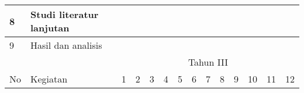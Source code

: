\begin{spacing}{1.5}
\begin{table}[htp]
\begin{tabular}{|l|l|llllllllllll|}
		8                                          & Studi literatur lanjutan                                                             & \multicolumn{1}{l|}{}                         & \multicolumn{1}{l|}{}                         & \multicolumn{1}{l|}{}                         & \multicolumn{1}{l|}{}                         & \multicolumn{1}{l|}{}                         & \multicolumn{1}{l|}{}                         & \multicolumn{1}{l|}{}                         & \multicolumn{1}{l|}{\cellcolor[HTML]{343434}} & \multicolumn{1}{l|}{\cellcolor[HTML]{343434}} & \multicolumn{1}{l|}{\cellcolor[HTML]{343434}} & \multicolumn{1}{l|}{}                         &                          \\ \hline
		9                                          & Hasil dan analisis                                                                   & \multicolumn{1}{l|}{}                         & \multicolumn{1}{l|}{}                         & \multicolumn{1}{l|}{}                         & \multicolumn{1}{l|}{}                         & \multicolumn{1}{l|}{}                         & \multicolumn{1}{l|}{}                         & \multicolumn{1}{l|}{}                         & \multicolumn{1}{l|}{}                         & \multicolumn{1}{l|}{}                         & \multicolumn{1}{l|}{\cellcolor[HTML]{343434}} & \multicolumn{1}{l|}{\cellcolor[HTML]{343434}} & \cellcolor[HTML]{343434} \\ \hline
		\multicolumn{1}{|c|}{}                     &                                                                                      & \multicolumn{12}{c|}{Tahun III}                                                                                                                                                                                                                                                                                                                                                                                                                                                                                                                                          \\ \cline{3-14} 
		\multicolumn{1}{|c|}{\multirow{-2}{*}{No}} & \multirow{-2}{*}{Kegiatan}                                                           & \multicolumn{1}{c|}{1}                        & \multicolumn{1}{c|}{2}                        & \multicolumn{1}{c|}{3}                        & \multicolumn{1}{c|}{4}                        & \multicolumn{1}{c|}{5}                        & \multicolumn{1}{c|}{6}                        & \multicolumn{1}{c|}{7}                        & \multicolumn{1}{c|}{8}                        & \multicolumn{1}{c|}{9}                        & \multicolumn{1}{c|}{10}                       & \multicolumn{1}{c|}{11}                       & \multicolumn{1}{c|}{12}  \\ \hline

\end{tabular}
\end{table}
\end{spacing}
